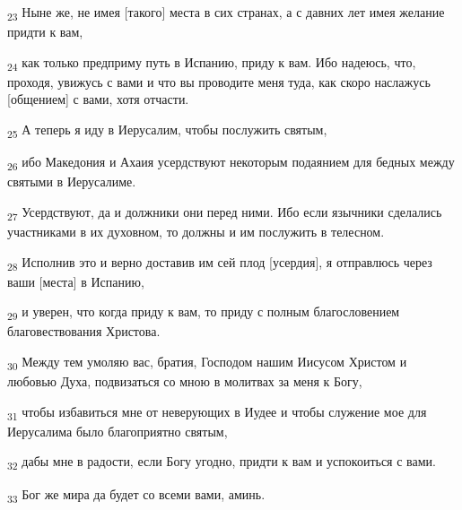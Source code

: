 \begin{tcolorbox}
\textsubscript{23} Ныне же, не имея [такого] места в сих странах, а с давних лет имея желание придти к вам,
\end{tcolorbox}
\begin{tcolorbox}
\textsubscript{24} как только предприму путь в Испанию, приду к вам. Ибо надеюсь, что, проходя, увижусь с вами и что вы проводите меня туда, как скоро наслажусь [общением] с вами, хотя отчасти.
\end{tcolorbox}
\begin{tcolorbox}
\textsubscript{25} А теперь я иду в Иерусалим, чтобы послужить святым,
\end{tcolorbox}
\begin{tcolorbox}
\textsubscript{26} ибо Македония и Ахаия усердствуют некоторым подаянием для бедных между святыми в Иерусалиме.
\end{tcolorbox}
\begin{tcolorbox}
\textsubscript{27} Усердствуют, да и должники они перед ними. Ибо если язычники сделались участниками в их духовном, то должны и им послужить в телесном.
\end{tcolorbox}
\begin{tcolorbox}
\textsubscript{28} Исполнив это и верно доставив им сей плод [усердия], я отправлюсь через ваши [места] в Испанию,
\end{tcolorbox}
\begin{tcolorbox}
\textsubscript{29} и уверен, что когда приду к вам, то приду с полным благословением благовествования Христова.
\end{tcolorbox}
\begin{tcolorbox}
\textsubscript{30} Между тем умоляю вас, братия, Господом нашим Иисусом Христом и любовью Духа, подвизаться со мною в молитвах за меня к Богу,
\end{tcolorbox}
\begin{tcolorbox}
\textsubscript{31} чтобы избавиться мне от неверующих в Иудее и чтобы служение мое для Иерусалима было благоприятно святым,
\end{tcolorbox}
\begin{tcolorbox}
\textsubscript{32} дабы мне в радости, если Богу угодно, придти к вам и успокоиться с вами.
\end{tcolorbox}
\begin{tcolorbox}
\textsubscript{33} Бог же мира да будет со всеми вами, аминь.
\end{tcolorbox}
